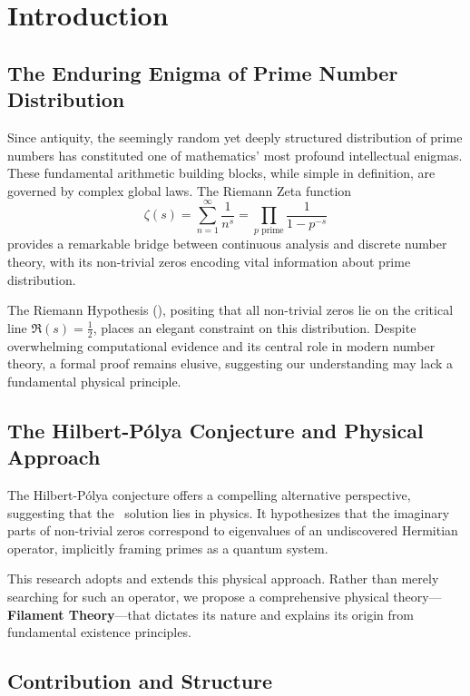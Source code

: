 \documentclass[11pt,a4paper]{article}
\newcommand{\RH}{\text{RH}}
\begin{document}
\tableofcontents
\newpage

\section{Introduction}

\subsection{The Enduring Enigma of Prime Number Distribution}

Since antiquity, the seemingly random yet deeply structured distribution of prime numbers has constituted one of mathematics' most profound intellectual enigmas. These fundamental arithmetic building blocks, while simple in definition, are governed by complex global laws. The Riemann Zeta function
\begin{equation}
\zeta(s) = \sum_{n=1}^{\infty} \frac{1}{n^s} = \prod_{p \text{ prime}} \frac{1}{1-p^{-s}}
\end{equation}
provides a remarkable bridge between continuous analysis and discrete number theory, with its non-trivial zeros encoding vital information about prime distribution.

The Riemann Hypothesis (\RH), positing that all non-trivial zeros lie on the critical line $\Re(s) = \frac{1}{2}$, places an elegant constraint on this distribution. Despite overwhelming computational evidence and its central role in modern number theory, a formal proof remains elusive, suggesting our understanding may lack a fundamental physical principle.

\subsection{The Hilbert-Pólya Conjecture and Physical Approach}

The Hilbert-Pólya conjecture offers a compelling alternative perspective, suggesting that the \RH\ solution lies in physics. It hypothesizes that the imaginary parts of non-trivial zeros correspond to eigenvalues of an undiscovered Hermitian operator, implicitly framing primes as a quantum system.

This research adopts and extends this physical approach. Rather than merely searching for such an operator, we propose a comprehensive physical theory—\textbf{Filament Theory}—that dictates its nature and explains its origin from fundamental existence principles.

\subsection{Contribution and Structure}
\end{document}
